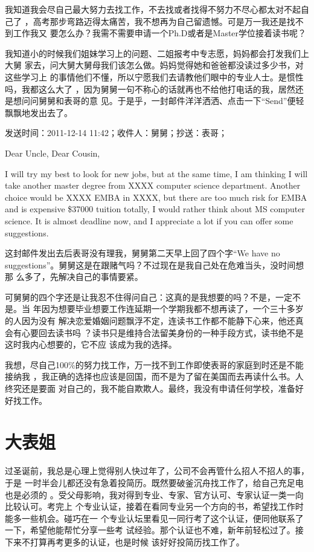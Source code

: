 \documentclass[12pt]{book}
\begin{document}
我知道我会尽自己最大努力去找工作，不去找或者找得不努力不尽心都太对不起自己了
，高考那步弯路迈得太痛苦，我不想再为自己留遗憾。可是万一我还是找不到工作我又
要怎么办？我需不需要申请一个Ph.D或者是Master学位接着读书呢？ 

我知道小的时候我们姐妹学习上的问题、二姐报考中专志愿，妈妈都会打发我们上大舅
家去，问大舅大舅母我们该怎么做。妈妈觉得她和爸爸都没读过多少书，对这些学习上
的事情他们不懂，所以宁愿我们去请教他们眼中的专业人士。是惯性吗，我都这么大了
，因为舅舅一句不称心的话就再也不给他打电话的我，居然还是想问问舅舅和表哥的意
见。于是乎，一封邮件洋洋洒洒、点击一下“Send”便轻飘飘地发出去了。

发送时间：2011-12-14 11:42；收件人：舅舅；抄送：表哥；

Dear Uncle, Dear Cousin, 

I will try my best to look for new jobs, but at the same time, I am thinking
I will take another master degree from XXXX computer science department. 
Another choice would be XXXX EMBA in XXXX, but there are too much risk for 
EMBA and is expensive \$37000 tuition totally, I would rather think about MS 
computer science. It is almost deadline now, and I appreciate a lot if you 
can offer some suggestions. 

这封邮件发出去后表哥没有理我，舅舅第二天早上回了四个字“We have no 
suggestions”。舅舅这是在跟赌气吗？不过现在是我自己处在危难当头，没时间想那
么多了，先解决自己的事情要紧。

可舅舅的四个字还是让我忍不住得问自己：这真的是我想要的吗？不是，一定不是。当
年因为想要毕业想要工作连延期一个学期我都不想再读了，一个三十多岁的人因为没有
解决恋爱婚姻问题飘浮不定，连读书工作都不能静下心来，他还真会有心要回去读书吗
？读书只是维持合法留美身份的一种手段方式，读书绝不是这时我内心想要的，它不应
该成为我的选择。

我想，尽自己100\%的努力找工作，万一找不到工作即使表哥的家庭到时还是不能接纳我
，我正确的选择也应该是回国，而不是为了留在美国而去再读什么书。人终究还是要面
对自己的，我不能自欺欺人。最终，我没有申请任何学校，准备好好找工作。
\section{大表姐}
\label{sec-9-27}

过圣诞前，我总是心理上觉得别人快过年了，公司不会再管什么招人不招人的事，于是
一时半会儿都还没有急着投简历。既然要破釜沉舟找工作了，给自己充足电也是必须的
。受父母影响，我对得到专业、专家、官方认可、专家认证一类一向比较认可。考完上
个专业认证，接着在看同专业另一个方向的书，希望找工作时能多一些机会。碰巧在一
个专业认坛里看见一同行考了这个认证，便同他联系了一下，希望他能帮忙分享一些考
试经验。那个认证也不难，新年前轻松过了。接下来不打算再考更多的认证，也是时候
该好好投简历找工作了。
\end{document}
